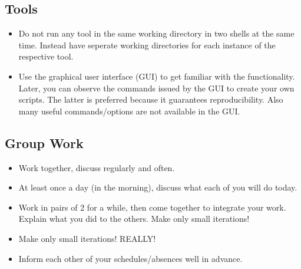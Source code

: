 \subsection{Tools}
\begin{itemize}
	\item Do not run any tool in the same working directory in two shells at the same time. Instead have seperate working directories for each instance of the respective tool.
	\item Use the graphical user interface (GUI) to get familiar with the functionality. Later, you can observe the commands issued by the GUI to create your own scripts. The latter is preferred because it guarantees reproducibility. Also many useful commands/options are not available in the GUI.
\end{itemize}

\subsection{Group Work}
	\begin{itemize}
	\item Work together, discuss regularly and often.
	\item At least once a day (in the morning), discuss what each of you will do today.
	\item Work in pairs of 2 for a while, then come together to integrate your work. Explain what you did to the others. Make only small iterations!
	\item Make only small iterations! REALLY!
	\item Inform each other of your schedules/absences well in advance.
	\end{itemize}